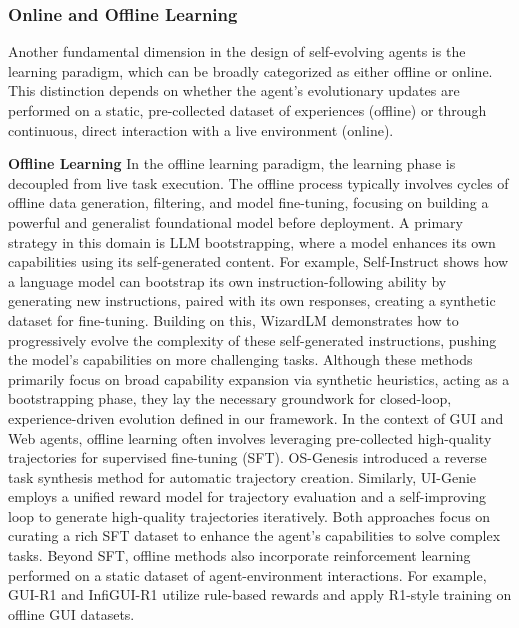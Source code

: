 \subsubsection{Online and Offline Learning}
Another fundamental dimension in the design of self-evolving agents is the learning paradigm, which can be broadly categorized as either offline or online. This distinction depends on whether the agent’s evolutionary updates are performed on a static, pre-collected dataset of experiences (offline) or through continuous, direct interaction with a live environment (online).

\textbf{Offline Learning}
In the offline learning paradigm, the learning phase is decoupled from live task execution. The offline process typically involves cycles of offline data generation, filtering, and model fine-tuning, focusing on building a powerful and generalist foundational model before deployment.
A primary strategy in this domain is LLM bootstrapping, where a model enhances its own capabilities using its self-generated content. For example, Self-Instruct\citep{wang2022self} shows how a language model can bootstrap its own instruction-following ability by generating new instructions, paired with its own responses, creating a synthetic dataset for fine-tuning. Building on this, WizardLM\citep{xu2024wizardlm} demonstrates how to progressively evolve the complexity of these self-generated instructions, pushing the model’s capabilities on more challenging tasks. Although these methods primarily focus on broad capability expansion via synthetic heuristics, acting as a bootstrapping phase, they lay the necessary groundwork for closed-loop, experience-driven evolution defined in our framework.
In the context of GUI and Web agents, offline learning often involves leveraging pre-collected high-quality trajectories for supervised fine-tuning (SFT). OS-Genesis\citep{sun2024genesis} introduced a reverse task synthesis method for automatic trajectory creation. Similarly, UI-Genie\citep{xiao2025ui} employs a unified reward model for trajectory evaluation and a self-improving loop to generate high-quality trajectories iteratively. Both approaches focus on curating a rich SFT dataset to enhance the agent’s capabilities to solve complex tasks.
Beyond SFT, offline methods also incorporate reinforcement learning performed on a static dataset of agent-environment interactions. For example, GUI-R1\citep{luo2025gui} and InfiGUI-R1\citep{liu2025infigui} utilize rule-based rewards and apply R1-style\citep{guo2025deepseek} training on offline GUI datasets.


